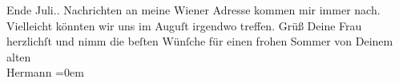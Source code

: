 \begin{ledgroupsized}[t]{13cm}
{{{                     Ende Juli.}}}\label{K_L01601_2h}. Nachrichten an meine Wiener {\pb}Adresse kommen mir
               immer nach. Vielleicht könnten wir uns im Auguſt irgendwo treffen. Grüß Deine Frau herzlichſt und nimm die
               beſten Wünſche für einen frohen Sommer von \pend
           \pstart
           Deinem alten{\\[\baselineskip]}\spacefill\mbox{Hermann}\pend
           \leftskip=0em{}          \endnumbering{}\end{ledgroupsized}  \newcommand{\dateiname}{L01601}\newcommand{\titel}{Hermann Bahr an Arthur Schnitzler, 21. 6. 1906}\newcommand{\editorInnen}{ Kurt Ifkovits,  Martin Anton Müller}
            \footnotesize
\begin{ledgroupsized}[t]{11.5cm}
\end{ledgroupsized}
         
      